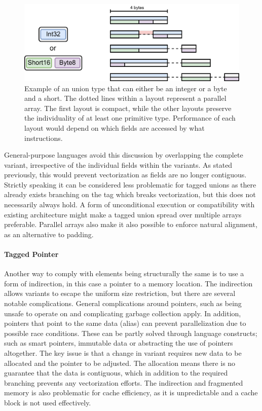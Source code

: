 \documentclass{article}
\begin{document}
\begin{figure}[ht]
    \centering
    \includegraphics[scale=0.1]{TaggedUnion.png}
    \caption
    { 
        Example of an union type that can either be an integer or a byte and a short.
        The dotted lines within a layout represent a parallel array.
        The first layout is compact, while the other layouts preserve the individuality of at least one primitive type.
        Performance of each layout would depend on which fields are accessed by what instructions.
    }
\end{figure}

General-purpose languages avoid this discussion by overlapping the complete variant, irrespective of the individual fields within the variants.
As stated previously, this would prevent vectorization as fields are no longer contiguous. 
Strictly speaking it can be considered less problematic for tagged unions as there already exists branching on the tag which breaks vectorization, but this does not necessarily always hold.
A form of unconditional execution or compatibility with existing architecture might make a tagged union spread over multiple arrays preferable.
Parallel arrays also make it also possible to enforce natural alignment, as an alternative to padding.

\paragraph{Tagged Pointer}

Another way to comply with elements being structurally the same is to use a form of indirection, in this case a pointer to a memory location.
The indirection allows variants to escape the uniform size restriction, but there are several notable complications.
General complications around pointers, such as being unsafe to operate on and complicating garbage collection apply.
In addition, pointers that point to the same data (alias) can prevent parallelization due to possible race conditions.
These can be partly solved through language constructs; such as smart pointers, immutable data or abstracting the use of pointers altogether.
The key issue is that a change in variant requires new data to be allocated and the pointer to be adjusted.
The allocation means there is no guarantee that the data is contiguous, which in addition to the required branching prevents any vectorization efforts.
The indirection and fragmented memory is also problematic for cache efficiency, as it is unpredictable and a cache block is not used effectively.
\end{document}

